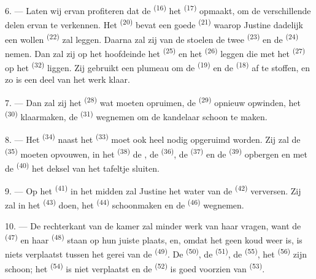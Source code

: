 6. --- Laten wij ervan profiteren dat de  \textsuperscript{(16)} het
 \textsuperscript{(17)} opmaakt, om de verschillende delen ervan te verkennen. Het
 \textsuperscript{(20)} bevat een goede 
\textsuperscript{(21)} waarop Justine dadelijk een wollen 
\textsuperscript{(22)} zal leggen. Daarna zal zij van de stoelen de twee
 \textsuperscript{(23)} en de 
\textsuperscript{(24)} nemen. Dan zal zij op het hoofdeinde het
 \textsuperscript{(25)} en het 
\textsuperscript{(26)} leggen die met het  \textsuperscript{(27)} op het
 \textsuperscript{(32)} liggen. Zij gebruikt een plumeau om de
 \textsuperscript{(19)} en de  \textsuperscript{(18)} af te
stoffen, en zo is een deel van het werk klaar.

7. --- Dan zal zij het  \textsuperscript{(28)} wat moeten opruimen, de
 \textsuperscript{(29)} opnieuw opwinden, het
 \textsuperscript{(30)} klaarmaken, de 
\textsuperscript{(31)} wegnemen om de kandelaar schoon te maken.

\VUsaut{5.0mm}
\VUsaut{3.0mm}

8. --- Het  \textsuperscript{(34)} naast het 
\textsuperscript{(33)} moet ook heel nodig opgeruimd worden. Zij zal de
 \textsuperscript{(35)} moeten opvouwen, in het
 \textsuperscript{(38)} de , de
 \textsuperscript{(36)}, de 
\textsuperscript{(37)} en de  \textsuperscript{(39)} opbergen en met de
 \textsuperscript{(40)} het deksel van het tafeltje sluiten.

9. --- Op het  \textsuperscript{(41)} in het midden zal Justine het
water van de  \textsuperscript{(42)} verversen. Zij zal  in het
 \textsuperscript{(43)} doen, het 
\textsuperscript{(44)} schoonmaken en de
 \textsuperscript{(46)} wegnemen.

10. --- De rechterkant van de kamer zal minder werk van haar vragen, want de
 \textsuperscript{(47)} en haar 
\textsuperscript{(48)} staan op hun juiste plaats, en, omdat het geen koud weer is, is niets
verplaatst tussen het gerei van de  \textsuperscript{(49)}. De
 \textsuperscript{(50)}, de
 \textsuperscript{(51)}, de 
\textsuperscript{(55)}, het  \textsuperscript{(56)} zijn schoon; het
 \textsuperscript{(54)} is niet verplaatst en de
 \textsuperscript{(52)} is goed voorzien van
 \textsuperscript{(53)}.


